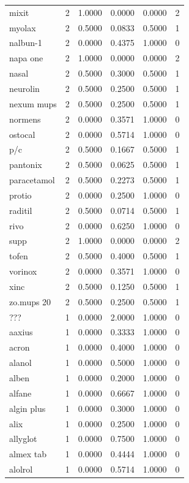 \begin{longtable}{p{3.0cm}rrrrr}
mixit & 2 & 1.0000 & 0.0000 & 0.0000 & 2 \\
myolax & 2 & 0.5000 & 0.0833 & 0.5000 & 1 \\
nalbun-1 & 2 & 0.0000 & 0.4375 & 1.0000 & 0 \\
napa one & 2 & 1.0000 & 0.0000 & 0.0000 & 2 \\
nasal & 2 & 0.5000 & 0.3000 & 0.5000 & 1 \\
neurolin & 2 & 0.5000 & 0.2500 & 0.5000 & 1 \\
nexum mups & 2 & 0.5000 & 0.2500 & 0.5000 & 1 \\
normens & 2 & 0.0000 & 0.3571 & 1.0000 & 0 \\
ostocal & 2 & 0.0000 & 0.5714 & 1.0000 & 0 \\
p/c & 2 & 0.5000 & 0.1667 & 0.5000 & 1 \\
pantonix & 2 & 0.5000 & 0.0625 & 0.5000 & 1 \\
paracetamol & 2 & 0.5000 & 0.2273 & 0.5000 & 1 \\
protio & 2 & 0.0000 & 0.2500 & 1.0000 & 0 \\
raditil & 2 & 0.5000 & 0.0714 & 0.5000 & 1 \\
rivo & 2 & 0.0000 & 0.6250 & 1.0000 & 0 \\
supp & 2 & 1.0000 & 0.0000 & 0.0000 & 2 \\
tofen & 2 & 0.5000 & 0.4000 & 0.5000 & 1 \\
vorinox & 2 & 0.0000 & 0.3571 & 1.0000 & 0 \\
xinc & 2 & 0.5000 & 0.1250 & 0.5000 & 1 \\
zo.mups 20 & 2 & 0.5000 & 0.2500 & 0.5000 & 1 \\
??? & 1 & 0.0000 & 2.0000 & 1.0000 & 0 \\
aaxius & 1 & 0.0000 & 0.3333 & 1.0000 & 0 \\
acron & 1 & 0.0000 & 0.4000 & 1.0000 & 0 \\
alanol & 1 & 0.0000 & 0.5000 & 1.0000 & 0 \\
alben & 1 & 0.0000 & 0.2000 & 1.0000 & 0 \\
alfane & 1 & 0.0000 & 0.6667 & 1.0000 & 0 \\
algin plus & 1 & 0.0000 & 0.3000 & 1.0000 & 0 \\
alix & 1 & 0.0000 & 0.2500 & 1.0000 & 0 \\
allyglot & 1 & 0.0000 & 0.7500 & 1.0000 & 0 \\
almex tab & 1 & 0.0000 & 0.4444 & 1.0000 & 0 \\
alolrol & 1 & 0.0000 & 0.5714 & 1.0000 & 0 \\

\end{longtable}
